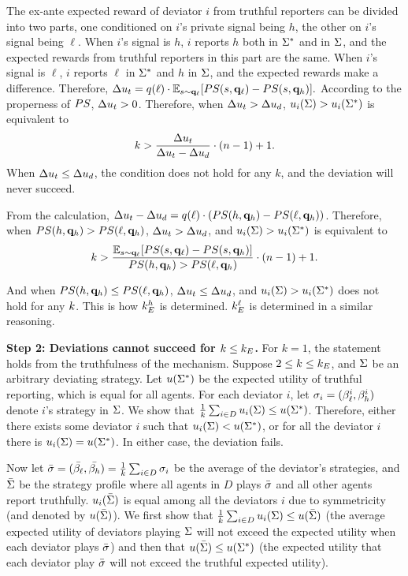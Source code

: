 The ex-ante expected reward of deviator $i$ from truthful reporters can be divided into two parts, one conditioned on $i$'s private signal being $h$, the other on $i$'s signal being $\ell$. When $i$'s signal is $h$, $i$ reports $h$ both in $\Sigma^*$ and in $\Sigma$, and the expected rewards from truthful reporters in this part are the same. When $i$'s signal is $\ell$, $i$ reports $\ell$ in $\Sigma^*$ and $h$ in $\Sigma$, and the expected rewards make a difference. Therefore, $\Delta u_t = q(\ell)\cdot  \mathbb{E}_{s\sim \mathbf{q}_{\ell}}[PS(s, \mathbf{q}_{\ell}) - PS(s, \mathbf{q}_{h})]. $ According to the properness of $PS$, $\Delta u_t > 0$.  Therefore, when $\Delta u_t > \Delta u_d$, $u_i(\Sigma) > u_i(\Sigma^*)$ is equivalent to
\begin{equation*}
    k > \frac{\Delta u_t}{\Delta u_t - \Delta u_d}\cdot (n-1) + 1. 
\end{equation*}
When $\Delta u_t \le \Delta u_d$, the condition does not hold for any $k$, and the deviation will never succeed. 

From the calculation, $\Delta u_t - \Delta u_d = q(\ell)\cdot   (PS(h, \mathbf{q}_h) - PS(\ell, \mathbf{q}_h))$. Therefore, when $PS(h, \mathbf{q}_h) > PS(\ell, \mathbf{q}_h)$, $\Delta u_t > \Delta u_d$, and $u_i(\Sigma) > u_i(\Sigma^*)$ is equivalent to 
\begin{equation*}
   k >\frac{\mathbb{E}_{s\sim \mathbf{q}_{\ell}}[PS(s, \mathbf{q}_{\ell}) - PS(s, \mathbf{q}_{h})]}{PS(h, \mathbf{q}_h) > PS(\ell, \mathbf{q}_h)} \cdot (n-1) + 1. 
\end{equation*}

And when $PS(h, \mathbf{q}_h) \le PS(\ell, \mathbf{q}_h)$, $\Delta u_t \le \Delta u_d$, and $u_i(\Sigma) > u_i(\Sigma^*)$ does not hold for any $k$. This is how $k_E^h$ is determined. $k_E^\ell$ is determined in a similar reasoning. 

\noindent\textbf{Step 2: Deviations cannot succeed for $k \le k_E$.} For $k = 1$, the statement holds from the truthfulness of the mechanism. Suppose $2\le k \le k_E$, and $\Sigma$ be an arbitrary deviating strategy. Let $u(\Sigma^*)$ be the expected utility of truthful reporting, which is equal for all agents. For each deviator $i$, let $\sigma_i = (\beta_{\ell}^i, \beta_{h}^i)$ denote $i$'s strategy in $\Sigma$.  We show that $\frac{1}{k} \sum_{i \in D} u_i(\Sigma) \le u(\Sigma^*)$. Therefore, either there exists some deviator $i$ such that $u_i(\Sigma) < u(\Sigma^*)$, or for all the deviator $i$ there is $u_i(\Sigma) = u(\Sigma^*)$. In either case, the deviation fails. 

Now let $\bar{\sigma} = (\bar{\beta_{\ell}}, \bar{\beta_{h}}) = \frac{1}{k} \sum_{i \in D} \sigma_i$ be the average of the deviator's strategies, and $\bar{\Sigma}$ be the strategy profile where all agents in $D$ plays $\bar{\sigma}$ and all other agents report truthfully. $u_i(\bar{\Sigma})$ is equal among all the deviators $i$ due to symmetricity (and denoted by $u(\bar{\Sigma})$). We first show that $\frac{1}{k} \sum_{i \in D} u_i(\Sigma) \le u(\bar{\Sigma})$ (the average expected utility of deviators playing $\Sigma$ will not exceed the expected utility when each deviator plays $\bar{\sigma}$) and then that $u(\bar{\Sigma}) \le u(\Sigma^*)$ (the expected utility that each deviator play $\bar{\sigma}$ will not exceed the truthful expected utility). 

